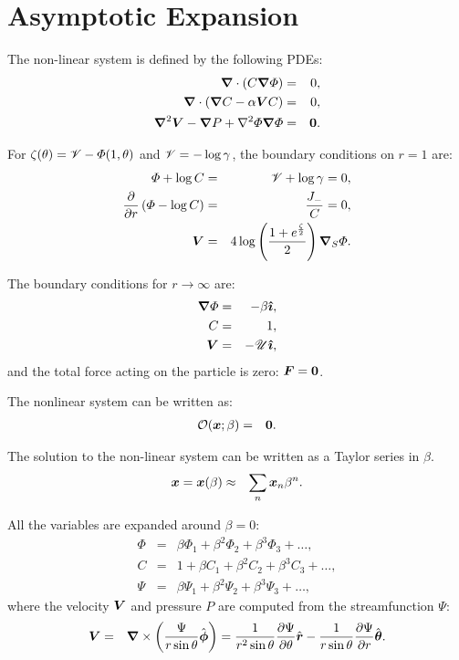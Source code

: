 \section{Asymptotic Expansion}

The non-linear system is defined by the following PDEs:
\label{PDEs}
\begin{eqnarray}
\boldsymbol{\nabla} \cdot \left(C \boldsymbol{\nabla} \varPhi\right) &=& 0, \\
\boldsymbol{\nabla} \cdot \left(\boldsymbol{\nabla} C - \alpha \boldsymbol{V} C\right) &=& 0, \\
\boldsymbol{\nabla}^2 \boldsymbol{V} - \boldsymbol{\nabla} P + \nabla^2 \varPhi \boldsymbol{\nabla} \varPhi &=& \boldsymbol{0}.
\end{eqnarray}

For $\zeta(\theta) = \mathscr{V} - \varPhi(1, \theta)$ and 
$\mathscr{V} = -\log \gamma$, the boundary conditions on $r = 1$ are:
\begin{eqnarray}
\varPhi + \log C &=& \mathscr{V} + \log \gamma = 0, \\
\frac{\partial }{\partial r}\left(\varPhi - \log C\right) &=& \frac{J_-}{C} = 0, \\
\boldsymbol{V} &=& 4\log\left(\frac{1 + e^\frac{\zeta}{2}}{2}\right) \boldsymbol{\nabla}_S \varPhi.
\end{eqnarray}

The boundary conditions for $r \rightarrow \infty$ are:
\begin{eqnarray}
\boldsymbol{\nabla} \varPhi &=& -\beta \boldsymbol{\hat{\imath}}, \\
C &=& 1, \\
\boldsymbol{V} &=& -\mathscr{U} \boldsymbol{\hat{\imath}},
\end{eqnarray}
and the total force acting on the particle is zero: $\boldsymbol{F} = \boldsymbol{0}$.

The nonlinear system can be written as: 
\begin{eqnarray}
\mathcal{O}(\boldsymbol{x};\beta) &=& \boldsymbol{0}.
\end{eqnarray}

The solution to the non-linear system can be written as a Taylor series in $\beta$.
\begin{eqnarray}
\boldsymbol{x} = \boldsymbol{x}(\beta) &\approx& \sum_n \boldsymbol{x}_n \beta^n.
\end{eqnarray}

All the variables are expanded around $\beta = 0$:
\begin{eqnarray}
\varPhi &=& \beta \varPhi_1 + \beta^2 \varPhi_2 + \beta^3 \varPhi_3 + \ldots, \\
C &=& 1 + \beta C_1 + \beta^2 C_2 + \beta^3 C_3 + \ldots, \\
\Psi &=& \beta \Psi_1 + \beta^2 \Psi_2 + \beta^3 \Psi_3 + \ldots ,
\end{eqnarray}
where the velocity $\boldsymbol{V}$ and pressure $P$ are computed from the streamfunction $\Psi$:
\begin{eqnarray}
\boldsymbol{V} &=& \boldsymbol{\nabla} \times \left(\frac{\Psi}{r \sin\theta} \hat{\boldsymbol{\phi}}\right) 
= \frac{1}{r^2 \sin\theta} \frac{\partial \Psi}{\partial \theta} \hat{\boldsymbol{r}} 
- \frac{1}{r \sin\theta} \frac{\partial \Psi}{\partial r} \hat{\boldsymbol{\theta}}.
\end{eqnarray}

